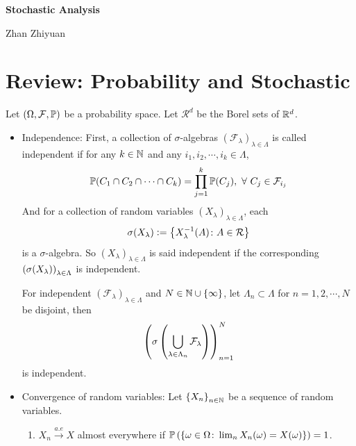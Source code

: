 \documentclass[a4paper,12pt]{article}
\newcommand{\name}{Zhan Zhiyuan}
\begin{document}
\begin{center}
  \Large \textbf{Stochastic Analysis}
\end{center}
\begin{center}\vspace{0.2em} {\Large \name\\}
  \end{center}

\section{Review: Probability and Stochastic}

Let $(\Omega, \mathcal{F}, \mathbb{P})$ be a probability space. Let $\mathcal{R}^d$ be the Borel sets of $\mathbb{R}^d$.
\begin{itemize}
  \item Independence: First, a collection of $\sigma$-algebras $(\mathcal{F}_{\lambda})_{\lambda \in \Lambda}$ is called independent if for any $k \in \mathbb{N}$ and any $i_1,i_2,\cdots,i_k \in \Lambda$,
  \begin{equation*}
    \mathbb{P}(C_1\cap C_2 \cap\cdots\cap C_k) = \prod_{j=1}^k\mathbb{P}(C_j),~\forall~C_j \in \mathcal{F}_{i_j}
  \end{equation*}
  And for a collection of random variables $(X_{\lambda})_{\lambda \in \Lambda}$, each
  \begin{equation*}
    \sigma(X_{\lambda}) \vcentcolon= \left\{X_{\lambda}^{-1}(A) \colon A \in \mathcal{R}\right\}
  \end{equation*}
  is a $\sigma$-algebra. So $(X_{\lambda})_{\lambda \in \Lambda}$ is said independent if the corresponding $\left(\sigma(X_{\lambda})\right)_{\lambda \in \Lambda}$ is independent.

  \begin{thm}
    For independent $(\mathcal{F}_{\lambda})_{\lambda \in \Lambda}$ and $N \in \mathbb{N} \cup \left\{\infty\right\}$, let $\Lambda_n \subset \Lambda$ for $n = 1,2, \cdots,N$ be disjoint, then
    \begin{equation*}
      \left(\sigma\left(\bigcup_{\lambda \in \Lambda_n}\mathcal{F}_{\lambda}\right)\right)_{n=1}^N
    \end{equation*}
    is independent.
  \end{thm}

  \item Convergence of random variables: Let $\left\{X_n\right\}_{n\in \mathbb{N}}$ be a sequence of random variables.
  \begin{enumerate}[label=(\arabic*)]
    \item $X_n\xrightarrow{a.e}X$ almost everywhere if $\mathbb{P}\left(\left\{\omega \in \Omega \colon \lim_{n}X_n(\omega) = X(\omega)\right\}\right) = 1$.


\end{enumerate}
\end{itemize}
\end{document}

